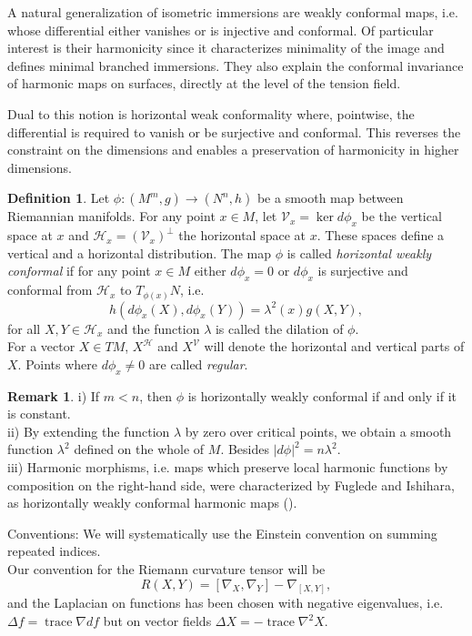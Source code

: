 \documentclass[12pt]{amsart}
\theoremstyle{plain}
\theoremstyle{definition}
\newtheorem{de}{Definition}
\newtheorem{rk}{Remark}
\begin{document}
A natural generalization of isometric immersions are weakly conformal maps, i.e.
whose differential either vanishes or is injective and conformal. Of particular
interest is their harmonicity since it characterizes minimality of the image and
defines minimal branched immersions. They also explain the conformal invariance of
harmonic maps on surfaces, directly at the level of the tension field.

Dual to this notion is horizontal weak conformality where, pointwise, the
differential is required to vanish or be surjective and conformal. This reverses the
constraint on the dimensions and enables a preservation of harmonicity in higher
dimensions.

\begin{de}
Let $\phi : (M^m ,g) \to (N^n ,h)$ be a smooth map between Riemannian manifolds. For
any point $x\in M$, let ${\mathcal{V}}_{x} = \ker d\phi_{x}$ be the vertical space at $x$ and
${\mathcal{H}}_{x} = ({\mathcal{V}}_{x})^{\perp}$ the horizontal space at $x$. These spaces define a
vertical and a horizontal distribution. The map $\phi$ is called {\em horizontal
weakly conformal} if for any point $x\in M$ either $d\phi_{x} =0$ or $d\phi_{x}$ is surjective and
conformal from ${\mathcal{H}}_{x}$ to $T_{\phi(x)}N$, i.e.
$$ h( d\phi_{x}(X), d\phi_{x}(Y)) = \lambda^{2}(x) g(X,Y), $$
for all $X,Y \in {\mathcal{H}}_{x}$ and the function $\lambda$ is called the dilation of $\phi$.\\
For a vector $X\in TM$, $X^{\mathcal{H}}$ and $X^{\mathcal{V}}$ will denote the horizontal and vertical
parts of $X$. Points where $d\phi_{x} \neq 0$ are called {\it regular}.
\end{de}

\begin{rk}
i) If $m<n$, then $\phi$ is horizontally weakly conformal if and only if it is constant. \\
ii) By extending the function $\lambda$ by zero over critical points, we obtain a
smooth
function $\lambda^2$ defined on the whole of $M$. Besides $|d\phi|^2 = n \lambda^2$.\\
iii) Harmonic morphisms, i.e. maps which preserve local harmonic functions by
composition on the right-hand side, were characterized by Fuglede and Ishihara, as
horizontally weakly conformal harmonic maps (\cite{Fug,Ish}).
\end{rk}

\noindent Conventions: We will systematically use the Einstein convention on summing repeated indices.\\
Our convention for the Riemann curvature tensor will be
$$ R(X,Y) = [ \nabla_{X} , \nabla_{Y} ] - \nabla_{[X,Y]} ,$$
and the Laplacian on functions has been chosen with negative eigenvalues, i.e. $
\Delta f = \operatorname{trace} \nabla df$ but on vector fields $\Delta X = - \operatorname{trace} \nabla^{2} X$.
\end{document}
